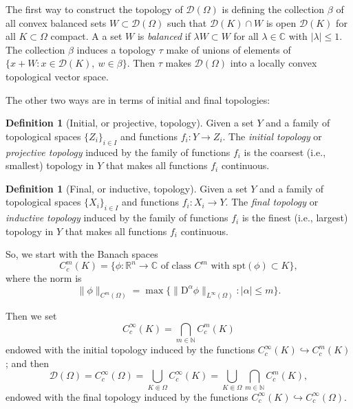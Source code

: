 \documentclass[a4paper,9pt]{amsart}
\newcommand{\scr}[1]{\mathscr{#1}}
\newcommand{\N}{\mathbb{N}}	%
\newcommand{\R}{\mathbb{R}}	%
\newcommand{\C}{\mathbb{C}}	%
\newcommand{\Diff}{\mathrm{D}}
\newcommand{\into}{\hookrightarrow}		%
\newcommand{\spt}{\mathrm{spt}}
\theoremstyle{plain}
\theoremstyle{definition}
\newtheorem{definition}[proposition]{Definition}
\theoremstyle{remark}
\begin{document}
The first way to construct the topology of $\scr D(\Omega)$ is defining the collection
$\beta$ of all convex balanced sets $W\subset\scr D(\Omega)$ such that $\scr D(K)\cap W$ is open $\scr D(K)$ for all $K\subset\Omega$ compact.
A a set $W$ is \emph{balanced} if $\lambda W \subset W$ for all $\lambda\in\C$ with $|\lambda|\le 1$.
The collection $\beta$ induces a topology $\tau$ make of unions of elements of $\{x+W:x\in\scr D(K),\ w\in\beta\}$.
Then $\tau$ makes $\scr D(\Omega)$ into a locally convex topological vector space.

The other two ways are in terms of initial and final topologies:

\begin{definition}[Initial, or projective, topology]
	Given a set $Y$ and a family of topological spaces $\{Z_i\}_{i\in I}$ and functions $f_i:Y\to Z_i$.
	The \emph{initial topology} or \emph{projective topology} induced by the family of functions $f_i$ is the coarsest (i.e., smallest) topology in $Y$ that makes all functions $f_i$ continuous.
\end{definition}
 
\begin{definition}[Final, or inductive, topology]
	Given a set $Y$ and a family of topological spaces $\{X_i\}_{i\in I}$ and functions $f_i:X_i\to Y$.
	The \emph{final topology} or \emph{inductive topology} induced by the family of functions $f_i$ is the finest (i.e., largest) topology in $Y$ that makes all functions $f_i$ continuous.
\end{definition}

So, we start with the Banach spaces
\begin{equation}
	C^m_c(K) = \{\phi:\R^n\to\C\text{ of class $C^m$ with }\spt(\phi)\subset K\} ,
\end{equation}
where the norm is 
\begin{equation}\label{eq67deff0b}
	\|\phi\|_{C^m(\Omega)} = \max\{ \|\Diff^\alpha\phi\|_{L^\infty(\Omega)} : |\alpha|\le m \} .
\end{equation}

Then we set
\begin{equation}
	C^\infty_c(K) = \bigcap_{m\in\N} C^m_c(K)
\end{equation}
endowed with the initial topology induced by the functions $C^\infty_c(K)\into C^m_c(K)$;
and then
\begin{equation}\label{eq67e2591e}
	\scr D(\Omega) = C^\infty_c(\Omega) = \bigcup_{K\Subset\Omega} C^\infty_c(K) 
	= \bigcup_{K\Subset\Omega}\bigcap_{m\in\N} C^m_c(K) ,
\end{equation}
endowed with the final topology induced by the functions $C^\infty_c(K)\into C^\infty_c(\Omega)$.
\end{document}

